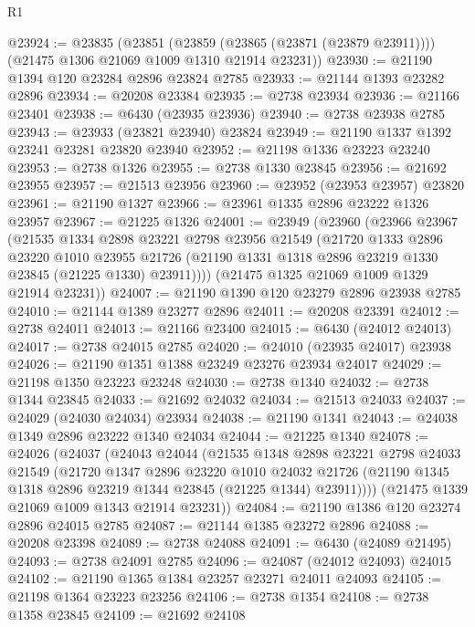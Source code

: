 \begin{lexlean}{R1}
\begin{coremodule}
@23924 := @23835
    (@23851
      (@23859 (@23865 (@23871 (@23879 @23911))))
      (@21475 @1306 @21069 @1009 @1310 @21914 @23231))
@23930 := @21190 @1394 @120 @23284 @2896 @23824 @2785
@23933 := @21144 @1393 @23282 @2896
@23934 := @20208 @23384
@23935 := @2738 @23934
@23936 := @21166 @23401
@23938 := @6430 (@23935 @23936)
@23940 := @2738 @23938 @2785
@23943 := @23933 (@23821 @23940) @23824
@23949 := @21190 @1337 @1392 @23241 @23281 @23820 @23940
@23952 := @21198 @1336 @23223 @23240
@23953 := @2738 @1326
@23955 := @2738 @1330 @23845
@23956 := @21692 @23955
@23957 := @21513 @23956
@23960 := @23952 (@23953 @23957) @23820
@23961 := @21190 @1327
@23966 := @23961 @1335 @2896 @23222 @1326 @23957
@23967 := @21225 @1326
@24001 := @23949
    (@23960
      (@23966
        @23967
        (@21535
          @1334
          @2898
          @23221
          @2798
          @23956
          @21549
          (@21720
            @1333
            @2896
            @23220
            @1010
            @23955
            @21726
            (@21190 @1331 @1318 @2896 @23219 @1330 @23845 (@21225 @1330) @23911))))
      (@21475 @1325 @21069 @1009 @1329 @21914 @23231))
@24007 := @21190 @1390 @120 @23279 @2896 @23938 @2785
@24010 := @21144 @1389 @23277 @2896
@24011 := @20208 @23391
@24012 := @2738 @24011
@24013 := @21166 @23400
@24015 := @6430 (@24012 @24013)
@24017 := @2738 @24015 @2785
@24020 := @24010 (@23935 @24017) @23938
@24026 := @21190 @1351 @1388 @23249 @23276 @23934 @24017
@24029 := @21198 @1350 @23223 @23248
@24030 := @2738 @1340
@24032 := @2738 @1344 @23845
@24033 := @21692 @24032
@24034 := @21513 @24033
@24037 := @24029 (@24030 @24034) @23934
@24038 := @21190 @1341
@24043 := @24038 @1349 @2896 @23222 @1340 @24034
@24044 := @21225 @1340
@24078 := @24026
    (@24037
      (@24043
        @24044
        (@21535
          @1348
          @2898
          @23221
          @2798
          @24033
          @21549
          (@21720
            @1347
            @2896
            @23220
            @1010
            @24032
            @21726
            (@21190 @1345 @1318 @2896 @23219 @1344 @23845 (@21225 @1344) @23911))))
      (@21475 @1339 @21069 @1009 @1343 @21914 @23231))
@24084 := @21190 @1386 @120 @23274 @2896 @24015 @2785
@24087 := @21144 @1385 @23272 @2896
@24088 := @20208 @23398
@24089 := @2738 @24088
@24091 := @6430 (@24089 @21495)
@24093 := @2738 @24091 @2785
@24096 := @24087 (@24012 @24093) @24015
@24102 := @21190 @1365 @1384 @23257 @23271 @24011 @24093
@24105 := @21198 @1364 @23223 @23256
@24106 := @2738 @1354
@24108 := @2738 @1358 @23845
@24109 := @21692 @24108

\end{coremodule}
\end{lexlean}
